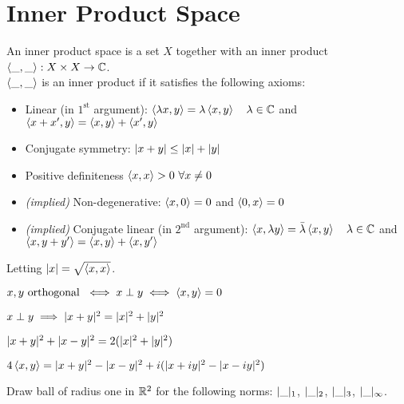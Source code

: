 \section{Inner Product Space}
An inner product space is a set $X$ together with an inner product $\left\langle \_,\_ \right\rangle: X \times X \to \mathbb{C}$.\\
$\left\langle \_,\_ \right\rangle$ is an inner product if it satisfies the following axioms:
\begin{itemize}
	\item Linear (in $1^{\text{st}}$ argument): $\left\langle \lambda x,y \right\rangle = \lambda \left\langle x,y \right\rangle \quad \lambda \in \mathbb{C}$ and $\left\langle x+x',y \right\rangle = \left\langle x,y \right\rangle +\left\langle x',y \right\rangle$
	\item Conjugate symmetry: $| x+y | \leq | x | + | y |$
	\item Positive definiteness $\left\langle x,x \right\rangle>0 \ \forall x \neq 0$
	\item \textit{(implied)} Non-degenerative: $\left\langle x,0 \right\rangle=0$ and $\left\langle 0,x \right\rangle=0$
	\item \textit{(implied)} Conjugate linear (in $2^{\text{nd}}$ argument): $\left\langle x,\lambda y \right\rangle = \bar{\lambda} \left\langle x,y \right\rangle \quad \lambda \in \mathbb{C}$ and $\left\langle x,y+y' \right\rangle = \left\langle x,y \right\rangle +\left\langle x,y' \right\rangle$
\end{itemize}
\begin{property}
	Letting $| x | = \sqrt{\left\langle x,x \right\rangle}$.
\end{property}
\begin{definition}
	$x,y \text{ orthogonal } \iff x \perp y \iff \left\langle x,y \right\rangle=0$
\end{definition}
\begin{property}
	$x \perp y \implies | x+y |^2 = | x |^2 + | y |^2$
\end{property}
\begin{property}
	$| x+y |^2 +| x-y |^2 = 2 (| x |^2 + | y |^2)$
\end{property}
\begin{property}
	$4 \left\langle x,y \right\rangle = | x+y |^2 - | x-y |^2 + i(| x+iy |^2 - | x-iy |^2)$
\end{property}

\begin{question}
	Draw ball of radius one in $\mathbb{R}^2$ for the following norms: $| \_ |_1$, $| \_ |_2$, $| \_ |_3$, $| \_ |_{\infty}$.
\end{question}



